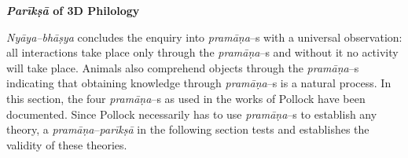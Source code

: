 \textbf{\textit{Parīkṣā} of 3D Philology}

\textit{Nyāya–bhāṣya} concludes the enquiry into\textit{ pramāṇa}–s with a universal observation: all interactions take place only through the \textit{pramāṇa}–s and without it no activity will take place. Animals also comprehend objects through the \textit{pramāṇa}–s indicating that obtaining knowledge through\textit{ pramāṇa}–s is a natural process. In this section, the four \textit{pramāṇa}–s as used in the works of Pollock have been documented. Since Pollock necessarily has to use \textit{pramāṇa}–s to establish any theory, a \textit{pramāṇa}–\textit{parīkṣā} in the following section tests and establishes the validity of these theories.

